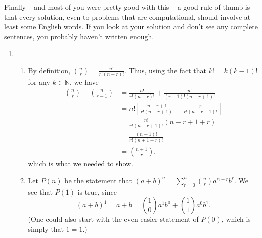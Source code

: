 \documentclass[12pt,letterpaper]{article}
\begin{document}
Finally -- and most of you were pretty good with this -- a good rule of thumb is that every solution, even to problems that are computational, should involve at least some English words. If you look at your solution and don't see any complete sentences, you probably haven't written enough.
\begin{enumerate}
\item \begin{enumerate}
\item By definition, $\displaystyle \binom{n}{r} = \frac{n!}{r!(n-r)!}$. Thus, using the fact that $k! = k(k-1)!$ for any $k\in \mathbb{N}$, we have
\begin{align*}
\binom{n}{r}+\binom{n}{r-1} & = \frac{n!}{r!(n-r)!}+\frac{n!}{(r-1)!(n-r+1)!}\\
& = n!\left[\frac{n-r+1}{r!(n-r+1)!}+\frac{r}{r!(n-r+1)!}\right]\\
& = \frac{n!}{r!(n-r+1)!}(n-r+1+r)\\
& = \frac{(n+1)!}{r!(n+1-r)!}\\
& = \binom{n+1}{r},
\end{align*}
which is what we needed to show.

\item Let $P(n)$ be the statement that $(a+b)^n = \sum_{r=0}^n\binom{n}{r}a^{n-r}b^r$. We see that $P(1)$ is true, since
\[
(a+b)^1 = a+b = \binom{1}{0}a^1b^0+\binom{1}{1}a^0b^1.
\]
(One could also start with the even easier statement of $P(0)$, which is simply that $1=1$.)


\end{enumerate}
\end{enumerate}
\end{document}
